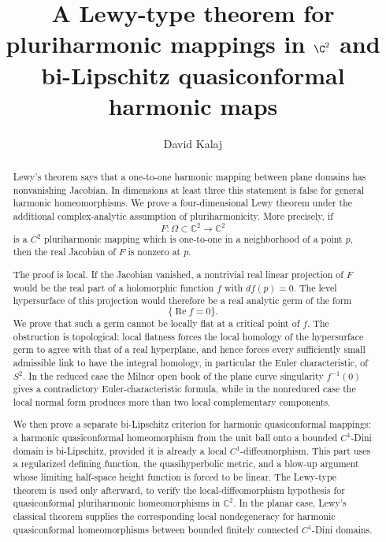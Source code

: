 \documentclass[11pt]{amsart}
\title[A Lewy theorem for pluriharmonic maps in $\C^2$]
{A Lewy-type theorem for pluriharmonic mappings in $\C^2$ and bi-Lipschitz quasiconformal harmonic maps}
\author{David Kalaj}
\theoremstyle{definition}
\theoremstyle{remark}
\begin{document}
\begin{abstract}
Lewy's theorem says that a one-to-one harmonic mapping between plane
domains has nonvanishing Jacobian. In dimensions at least three this
statement is false for general harmonic homeomorphisms. We prove a
four-dimensional Lewy theorem under the additional complex-analytic
assumption of pluriharmonicity. More precisely, if
\[
F:\Omega\subset \mathbb C^2\to \mathbb C^2
\]
is a \(C^2\) pluriharmonic mapping which is one-to-one in a neighborhood
of a point \(p\), then the real Jacobian of \(F\) is nonzero at \(p\).

The proof is local. If the Jacobian vanished, a nontrivial real linear
projection of \(F\) would be the real part of a holomorphic function
\(f\) with \(df(p)=0\). The level hypersurface of this projection would
therefore be a real analytic germ of the form
\[
\{\operatorname{Re} f=0\}.
\]
We prove that such a germ cannot be locally flat at a critical point of
\(f\). The obstruction is topological: local flatness forces the local
homology of the hypersurface germ to agree with that of a real
hyperplane, and hence forces every sufficiently small admissible link
to have the integral homology, in particular the Euler characteristic,
of \(S^2\). In the reduced case the Milnor open book of the plane curve
singularity \(f^{-1}(0)\) gives a contradictory Euler-characteristic
formula, while in the nonreduced case the local normal form produces
more than two local complementary components.

We then prove a separate bi-Lipschitz criterion for harmonic
quasiconformal mappings: a harmonic quasiconformal homeomorphism from
the unit ball onto a bounded \(C^1\)-Dini domain is bi-Lipschitz,
provided it is already a local \(C^1\)-diffeomorphism. This part uses a
regularized defining function, the quasihyperbolic metric, and a
blow-up argument whose limiting half-space height function is forced to
be linear. The Lewy-type theorem is used only afterward, to verify the
local-diffeomorphism hypothesis for quasiconformal pluriharmonic
homeomorphisms in \(\mathbb C^2\). In the planar case, Lewy's classical
theorem supplies the corresponding local nondegeneracy for harmonic
quasiconformal homeomorphisms between bounded finitely connected
\(C^1\)-Dini domains.
\end{abstract}


\maketitle
\end{document}
